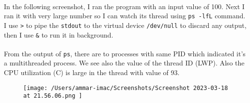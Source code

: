 \documentclass{article}
\def\c#1{\texttt{#1}}
\begin{document}
\paragraph{}
In the following screenshot, I ran the program with an input value of 100. Next I ran it with very large
number so I can watch its thread using \c{ps -lfL} command. I use \c{>} to pipe the \c{stdout} to
the virtual device \c{/dev/null} to discard any output, then I use \c{\&} to run it in background.

\paragraph{}
From the output of \c{ps}, there are to processes with same PID which indicated it's a multithreaded
process. We see also the value of the thread ID (LWP). Also the CPU utilization (C) is large in the thread
with value of 93.
\begin{figure}[ht]
  \centering
  \texttt{[image: /Users/ammar-imac/Screenshots/Screenshot 2023-03-18 at 21.56.06.png ]}
\end{figure}
\end{document}
